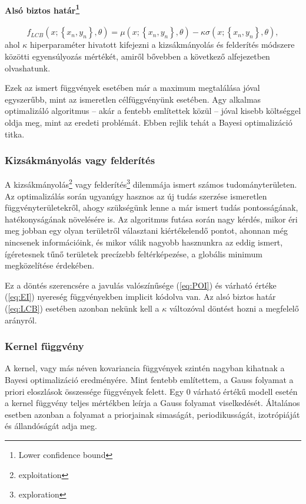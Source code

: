 \paragraph[Alsó biztos határ]{Alsó biztos határ\footnote{Lower confidence bound}}
\begin{equation}
	\label{eq:LCB}
	f_{LCB}(x;\left\lbrace x_n,y_n\right\rbrace ,\theta)=\mu(x;\left\lbrace x_n,y_n\right\rbrace ,\theta)-\kappa \sigma(x;\left\lbrace x_n,y_n\right\rbrace ,\theta),
\end{equation}
ahol $\kappa$ hiperparaméter hivatott kifejezni a kizsákmányolás és felderítés módszere közötti egyensúlyozás mértékét, amiről bővebben a következő alfejezetben olvashatunk.

Ezek az ismert függvények esetében már a maximum megtalálása jóval egyszerűbb, mint az ismeretlen célfüggvényünk esetében. Agy alkalmas optimalizáló algoritmus -- akár a fentebb említettek közül -- jóval kisebb költséggel oldja meg, mint az eredeti problémát. Ebben rejlik tehát a Bayesi optimalizáció titka.

\subsubsection{Kizsákmányolás vagy felderítés}
A kizsákmányolás\footnote{exploitation} vagy felderítés\footnote{exploration} dilemmája ismert számos tudományterületen. Az optimalizálás során ugyanúgy hasznos az új tudás szerzése ismeretlen függvényterületekről, ahogy szükségünk lenne a már ismert tudás pontosságának, hatékonyságának növelésére is. Az algoritmus futása során nagy kérdés, mikor éri meg jobban egy olyan területről választani kiértékelendő pontot, ahonnan még nincsenek információink, és mikor válik nagyobb hasznunkra az eddig ismert, ígéretesnek tűnő területek precízebb feltérképezése, a globális minimum megközelítése érdekében.

Ez a döntés szerencsére a javulás valószínűsége (\ref{eq:POI}) és várható értéke (\ref{eq:EI}) nyereség függvényekben implicit kódolva van. Az alsó biztos határ (\ref{eq:LCB}) esetében azonban nekünk kell a $\kappa$ változóval döntést hozni a megfelelő arányról.

\subsubsection{Kernel függvény}
A kernel, vagy más néven kovariancia függvények szintén nagyban kihatnak a Bayesi optimalizáció eredményére. Mint fentebb említettem, a Gauss folyamat a priori eloszlások összessége függvények felett.
Egy 0 várható értékű modell esetén a kernel függvény teljes mértékben leírja a Gauss folyamat viselkedését.
Általános esetben azonban a folyamat a priorjainak simaságát, periodikusságát, izotrópiáját és állandóságát adja meg.


